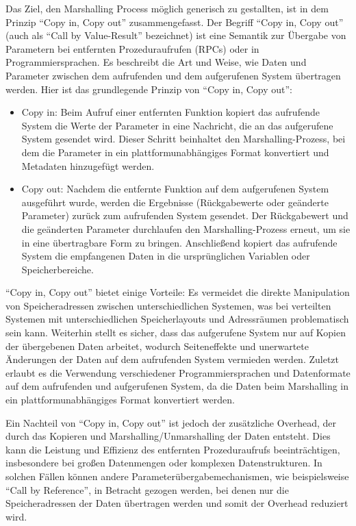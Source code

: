Das Ziel, den Marshalling Process möglich generisch zu gestallten, ist in dem Prinzip \enquote{Copy in, Copy out} zusammengefasst. Der Begriff \enquote{Copy in, Copy out} (auch als \enquote{Call by Value-Result} bezeichnet) ist eine Semantik zur Übergabe von Parametern bei entfernten Prozeduraufrufen (RPCs) oder in Programmiersprachen. Es beschreibt die Art und Weise, wie Daten und Parameter zwischen dem aufrufenden und dem aufgerufenen System übertragen werden. Hier ist das grundlegende Prinzip von \enquote{Copy in, Copy out}:
\begin{itemize} 
\item Copy in: Beim Aufruf einer entfernten Funktion kopiert das aufrufende System die Werte der Parameter in eine Nachricht, die an das aufgerufene System gesendet wird. Dieser Schritt beinhaltet den Marshalling-Prozess, bei dem die Parameter in ein plattformunabhängiges Format konvertiert und Metadaten hinzugefügt werden.
\item Copy out: Nachdem die entfernte Funktion auf dem aufgerufenen System ausgeführt wurde, werden die Ergebnisse (Rückgabewerte oder geänderte Parameter) zurück zum aufrufenden System gesendet. Der Rückgabewert und die geänderten Parameter durchlaufen den Marshalling-Prozess erneut, um sie in eine übertragbare Form zu bringen. Anschließend kopiert das aufrufende System die empfangenen Daten in die ursprünglichen Variablen oder Speicherbereiche.
\end{itemize} 
\enquote{Copy in, Copy out} bietet einige Vorteile: Es vermeidet die direkte Manipulation von Speicheradressen zwischen unterschiedlichen Systemen, was bei verteilten Systemen mit unterschiedlichen Speicherlayouts und Adressräumen problematisch sein kann. Weiterhin stellt es sicher, dass das aufgerufene System nur auf Kopien der übergebenen Daten arbeitet, wodurch Seiteneffekte und unerwartete Änderungen der Daten auf dem aufrufenden System vermieden werden. Zuletzt erlaubt es die Verwendung verschiedener Programmiersprachen und Datenformate auf dem aufrufenden und aufgerufenen System, da die Daten beim Marshalling in ein plattformunabhängiges Format konvertiert werden.

Ein Nachteil von \enquote{Copy in, Copy out} ist jedoch der zusätzliche Overhead, der durch das Kopieren und Marshalling/Unmarshalling der Daten entsteht. Dies kann die Leistung und Effizienz des entfernten Prozeduraufrufs beeinträchtigen, insbesondere bei großen Datenmengen oder komplexen Datenstrukturen. In solchen Fällen können andere Parameterübergabemechanismen, wie beispielsweise \enquote{Call by Reference}, in Betracht gezogen werden, bei denen nur die Speicheradressen der Daten übertragen werden und somit der Overhead reduziert wird. 

